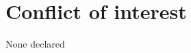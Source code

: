 \section*{Conflict of interest}
\label{sec:conflict1}

None declared


\cleardoublepage

\begin{otherlanguage}{english}

\end{otherlanguage}
